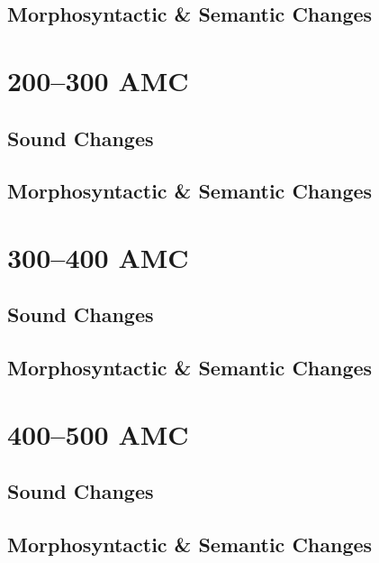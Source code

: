 \subsection{Morphosyntactic \& Semantic Changes}


\section{200--300 AMC}

\subsection{Sound Changes}


\subsection{Morphosyntactic \& Semantic Changes}


\section{300--400 AMC}

\subsection{Sound Changes}


\subsection{Morphosyntactic \& Semantic Changes}


\section{400--500 AMC}

\subsection{Sound Changes}


\subsection{Morphosyntactic \& Semantic Changes}


